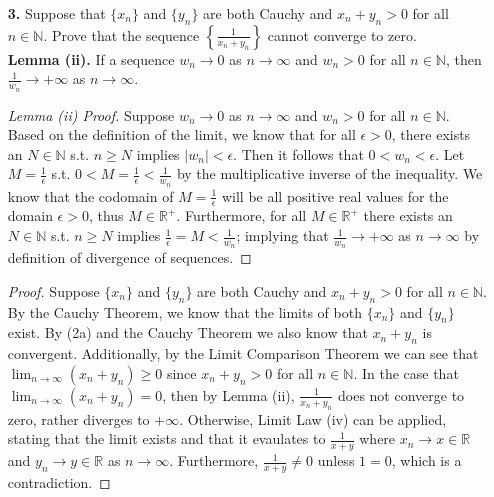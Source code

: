 \documentclass[ 12pt ]{article}
\begin{document}
\begin{enumerate}
	\item[\textbf{3.}] Suppose that $\{x_n\}$ and $\{y_n\}$ are both Cauchy and $x_n + y_n > 0$ for all $n \in \mathbb{N}$. Prove that the sequence
		$\left \{\frac{1}{x_n+y_n} \right \}$ cannot converge to zero. \\

	\textbf{Lemma (ii).} If a sequence $w_n \rightarrow 0$ as $n \rightarrow \infty$ and $w_n > 0$ for all $n \in \mathbb{N}$, then
		$\frac{1}{w_n} \rightarrow +\infty$ as $n \rightarrow \infty$.

	\begin{proof}[Lemma (ii) Proof]
		Suppose $w_n \rightarrow 0$ as $n \rightarrow \infty$ and $w_n > 0$ for all $n \in \mathbb{N}$. Based on the definition of the limit, we know that for all
		$\epsilon > 0$, there exists an $N \in \mathbb{N}$ s.t. $n \geq N$ implies $|w_n| < \epsilon$. Then it follows that $0 < w_n < \epsilon$. Let $M = \frac{1}{\epsilon}$
		s.t. $0 < M = \frac{1}{\epsilon} < \frac{1}{w_n}$ by the multiplicative inverse of the inequality. We know that the codomain of $M = \frac{1}{\epsilon}$ will
		be all positive real values for the domain $\epsilon > 0$, thus $M \in \mathbb{R}^+$. Furthermore, for all $M \in \mathbb{R}^+$ there exists an
		$N \in \mathbb{N}$ s.t. $n \geq N$ implies $\frac{1}{\epsilon} = M < \frac{1}{w_n}$; implying that $\frac{1}{w_n} \rightarrow +\infty$ as
		$n \rightarrow \infty$ by definition of divergence of sequences.
	\end{proof}

	\begin{proof}
		Suppose $\{x_n\}$ and $\{y_n\}$ are both Cauchy and $x_n + y_n > 0$ for all $n \in \mathbb{N}$. By the Cauchy Theorem, we know that the limits of both
		$\{x_n\}$ and $\{y_n\}$ exist. By (2a) and the Cauchy Theorem we also know that $x_n + y_n$ is convergent. Additionally, by the Limit Comparison Theorem
		we can see that $\lim_{n \rightarrow \infty}(x_n + y_n) \geq 0$ since $x_n + y_n > 0$ for all $n \in \mathbb{N}$. In the case that
		$\lim_{n \rightarrow \infty}(x_n + y_n) = 0$, then by Lemma (ii), $\frac{1}{x_n + y_n}$ does not converge to zero, rather diverges to $+\infty$. Otherwise,
		Limit Law (iv) can be applied, stating that the limit exists and that it evaulates to $\frac{1}{x+y}$ where $x_n \rightarrow x \in \mathbb{R}$ and
		$y_n \rightarrow y \in \mathbb{R}$ as $n \rightarrow \infty$. Furthermore, $\frac{1}{x+y} \neq 0$ unless $1 = 0$, which is a contradiction.
	\end{proof}



\end{enumerate}
\end{document}
